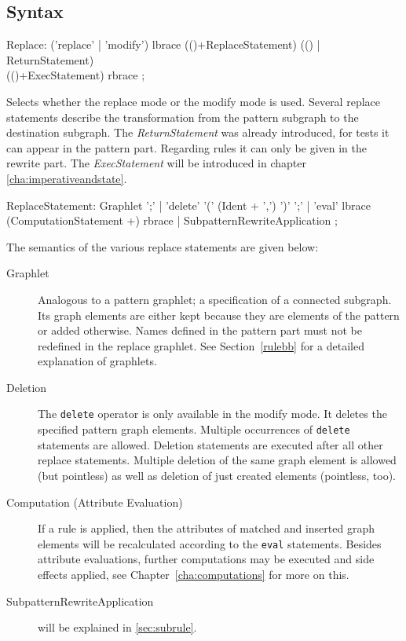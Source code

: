 \subsection{Syntax}

\begin{rail}
  Replace: ('replace' | 'modify') lbrace (()+ReplaceStatement) (() | ReturnStatement) \\
  (()+ExecStatement) rbrace ;
\end{rail}\label{replclause}
Selects whether the replace mode or the modify mode is used.
Several replace statements describe the transformation from the pattern subgraph to the destination subgraph.
The \emph{ReturnStatement} was already introduced, for tests it can appear in the pattern part.
Regarding rules it can only be given in the rewrite part.
The \emph{ExecStatement} will be introduced in chapter \ref{cha:imperativeandstate}.

\begin{rail}
  ReplaceStatement:
    Graphlet ';' |
    'delete' '(' (Ident + ',') ')' ';' |
    'eval' lbrace (ComputationStatement +) rbrace |
    SubpatternRewriteApplication
    ;
\end{rail}\label{replstmt}
The semantics of the various replace statements are given below:
\begin{description}
  \item[Graphlet] Analogous to a pattern graphlet; a specification of a connected subgraph. Its graph elements are either kept because they are elements of the pattern or added otherwise. Names defined in the pattern part must not be redefined in the replace graphlet. See Section~\ref{rulebb} for a detailed explanation of graphlets.
  \item[Deletion] The \texttt{delete} operator is only available in the modify mode. It deletes the specified pattern graph elements. Multiple occurrences of \texttt{delete} statements are allowed. Deletion statements are executed after all other replace statements. Multiple deletion of the same graph element is allowed (but pointless) as well as deletion of just created elements (pointless, too).
  \item[Computation (Attribute Evaluation)] If a rule is applied, then the attributes of matched and inserted graph elements will be recalculated according to the \texttt{eval} statements. Besides attribute evaluations, further computations may be executed and side effects applied, see Chapter~\ref{cha:computations} for more on this.
  \item[SubpatternRewriteApplication] will be explained in \ref{sec:subrule}.
\end{description}

